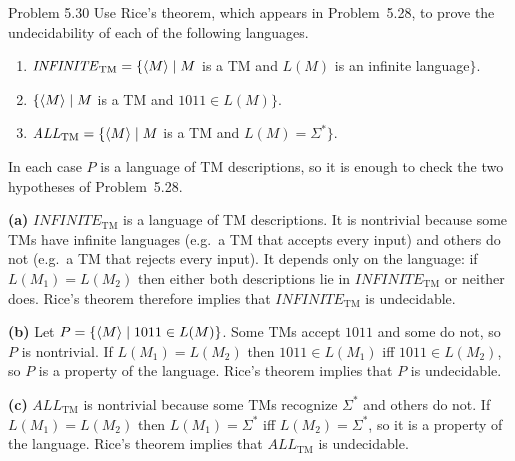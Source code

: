 \begin{question}{Problem 5.30}
Use Rice's theorem, which appears in Problem~5.28, to prove the undecidability of each of the following languages.
\begin{enumerate}[label=\alph*.]
\item $\mathit{INFINITE}_{\mathrm{TM}}=\{\langle M\rangle\mid M$ is a TM and $L(M)$ is an infinite language$\}$.
\item $\{\langle M\rangle\mid M$ is a TM and $1011\in L(M)\}$.
\item $\mathit{ALL}_{\mathrm{TM}}=\{\langle M\rangle\mid M$ is a TM and $L(M)=\Sigma^*\}$.
\end{enumerate}
\end{question}
\begin{soln}
In each case $P$ is a language of TM descriptions, so it is enough to check the two hypotheses of Problem~5.28.

\textbf{(a)} $\mathit{INFINITE}_{\mathrm{TM}}$ is a language of TM descriptions. It is nontrivial because some TMs have infinite languages (e.g.\ a TM that accepts every input) and others do not (e.g.\ a TM that rejects every input). It depends only on the language: if $L(M_1)=L(M_2)$ then either both descriptions lie in $\mathit{INFINITE}_{\mathrm{TM}}$ or neither does. Rice's theorem therefore implies that $\mathit{INFINITE}_{\mathrm{TM}}$ is undecidable.

\textbf{(b)} Let $P=\{\langle M\rangle\mid 1011\in L(M)\}$. Some TMs accept $1011$ and some do not, so $P$ is nontrivial. If $L(M_1)=L(M_2)$ then $1011\in L(M_1)$ iff $1011\in L(M_2)$, so $P$ is a property of the language. Rice's theorem implies that $P$ is undecidable.

\textbf{(c)} $\mathit{ALL}_{\mathrm{TM}}$ is nontrivial because some TMs recognize $\Sigma^*$ and others do not. If $L(M_1)=L(M_2)$ then $L(M_1)=\Sigma^*$ iff $L(M_2)=\Sigma^*$, so it is a property of the language. Rice's theorem implies that $\mathit{ALL}_{\mathrm{TM}}$ is undecidable.
\end{soln}

